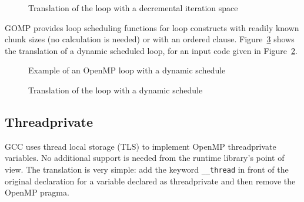 \begin{figure}[htbp]
{\indent
  {\mySmallFontSize
    \begin{latexonly}
    
    \end{latexonly}
    \begin{htmlonly}
    
    \end{htmlonly}
  }
}
\caption{Translation of the loop with a decremental iteration space}
\label{Manual:omp:ompfor5-trans}
\end{figure}

GOMP provides loop scheduling functions for loop constructs with readily
known chunk sizes (no calculation is needed) or with an ordered clause. 
Figure~\ref{Manual:omp:ompfor4-trans} shows the translation of a dynamic scheduled loop,  for an input code given in
Figure~\ref{Manual:omp:ompfor4}. 

\lstset{language=C,basicstyle=\scriptsize}
\begin{figure}[htbp]
{\indent
  {\mySmallFontSize
    \begin{latexonly}
    
    \end{latexonly}
    \begin{htmlonly}
    
    \end{htmlonly}
  }
}
\caption{Example of an OpenMP loop with a dynamic schedule}
\label{Manual:omp:ompfor4}
\end{figure}

\begin{figure}[htbp]
{\indent
  {\mySmallFontSize
    \begin{latexonly}
    
    \end{latexonly}
    \begin{htmlonly}
    
    \end{htmlonly}
  }
}
\caption{Translation of the loop with a dynamic schedule}
\label{Manual:omp:ompfor4-trans}
\end{figure}

\clearpage
\subsection{Threadprivate}
GCC uses thread local storage (TLS) to implement OpenMP threadprivate variables. 
No additional support is needed from the runtime library's point of view. 
The translation is very simple: add the keyword \lstinline{__thread} in front of the original declaration for a variable declared as threadprivate and then remove the OpenMP pragma. 


